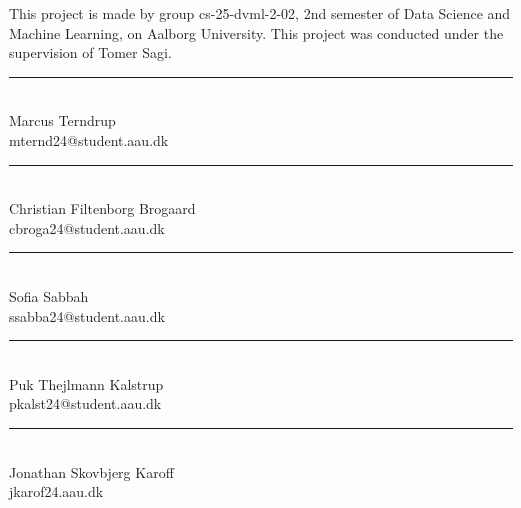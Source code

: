 
This project is made by group cs-25-dvml-2-02, 2nd semester of Data Science and Machine Learning, on Aalborg University. This project was conducted under the supervision of Tomer Sagi.

\vspace{40 mm} 
\begin{minipage}[b]{0.45\textwidth}
	\centering
	\rule{\textwidth}{0.5pt}\\
	Marcus Terndrup \\
	{\footnotesize mternd24@student.aau.dk
	}
\end{minipage}
\hfill
\vspace{40 mm}
\begin{minipage}[b]{0.45\textwidth}
	\centering
	\rule{\textwidth}{0.5pt}\\
	Christian Filtenborg Brogaard\\
	{\footnotesize cbroga24@student.aau.dk
	}
\end{minipage}
\hfill
\begin{minipage}[b]{0.45\textwidth}
	\centering
	\rule{\textwidth}{0.5pt}\\
	Sofia Sabbah \\
	{\footnotesize ssabba24@student.aau.dk
	}
\end{minipage}
\hfill
\begin{minipage}[b]{0.45\textwidth}
	\centering
	\rule{\textwidth}{0.5pt}\\
	Puk Thejlmann Kalstrup\\
	{\footnotesize pkalst24@student.aau.dk}
\end{minipage}
\hfill
\vspace{40 mm}
\begin{minipage}[b]{0.45\textwidth}
	\centering
	\rule{\textwidth}{0.5pt}\\
	Jonathan Skovbjerg Karoff\\
	{\footnotesize jkarof24.aau.dk
	}
\end{minipage}